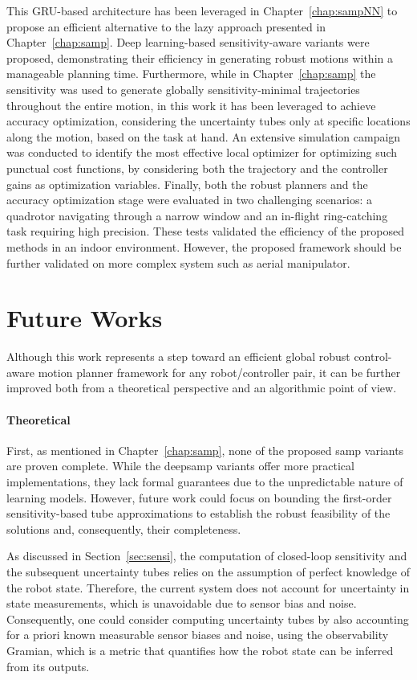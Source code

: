 This GRU-based architecture has been leveraged in Chapter~\ref{chap:sampNN} to propose an efficient alternative to the lazy approach presented in Chapter~\ref{chap:samp}.
Deep learning-based sensitivity-aware variants were proposed, demonstrating their efficiency in generating robust motions within a manageable planning time.
Furthermore, while in Chapter~\ref{chap:samp} the sensitivity was used to generate globally sensitivity-minimal trajectories throughout the entire motion, in this work it has been leveraged to achieve accuracy optimization, considering the uncertainty tubes only at specific locations along the motion, based on the task at hand.
An extensive simulation campaign was conducted to identify the most effective local optimizer for optimizing such punctual cost functions, by considering both the trajectory and the controller gains as optimization variables.
Finally, both the robust planners and the accuracy optimization stage were evaluated in two challenging scenarios: a quadrotor navigating through a narrow window and an in-flight ring-catching task requiring high precision. 
These tests validated the efficiency of the proposed methods in an indoor environment.
However, the proposed framework should be further validated on more complex system such as aerial manipulator.

\section{Future Works}

Although this work represents a step toward an efficient global robust control-aware motion planner framework for any robot/controller pair, it can be further improved both from a theoretical perspective and an algorithmic point of view.

\paragraph{Theoretical}

First, as mentioned in Chapter~\ref{chap:samp}, none of the proposed \gls{samp} variants are proven complete.
While the \gls{deepsamp} variants offer more practical implementations, they lack formal guarantees due to the unpredictable nature of learning models.
However, future work could focus on bounding the first-order sensitivity-based tube approximations to establish the robust feasibility of the  solutions and, consequently, their completeness.

As discussed in Section~\ref{sec:sensi}, the computation of closed-loop sensitivity and the subsequent uncertainty tubes relies on the assumption of perfect knowledge of the robot state. 
Therefore, the current system does not account for uncertainty in state measurements, which is unavoidable due to sensor bias and noise.
Consequently, one could consider computing uncertainty tubes by also accounting for a priori known measurable sensor biases and noise, using the observability Gramian, which is a metric that quantifies how the robot state can be inferred from its outputs.

